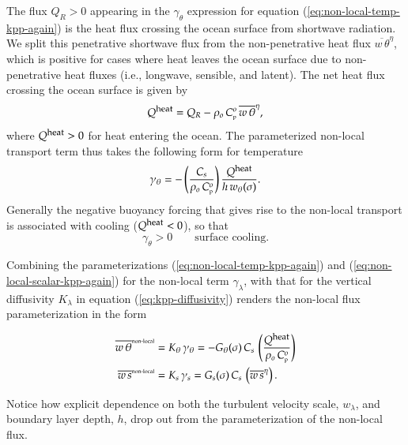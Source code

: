 The flux $Q_{R}>0$ appearing in the $\gamma_{\theta}$ expression for
equation (\ref{eq:non-local-temp-kpp-again}) is the heat flux crossing
the ocean surface from shortwave radiation.  We split this penetrative
shortwave flux from the non-penetrative heat flux $\overline{w \,
  \theta}^{\eta}$, which is positive for cases where heat leaves the
ocean surface due to non-penetrative heat fluxes (i.e., longwave,
sensible, and latent).  The net heat flux crossing the ocean surface
is given by
\begin{equation}
 Q^{\mbox{\footnotesize heat}}= Q_{R} - \rho_{o} \, C_{\mbox{\tiny p}}^{o} \,  \overline{w \, \theta}^{\eta},
\label{eq:heat-flux-penetrative-and-non-penetrative}
\end{equation}
where $Q^{\mbox{\footnotesize heat}} > 0$ for heat entering the ocean.
The parameterized non-local transport term thus takes the following
form for temperature
\begin{equation}
 \gamma_{\theta} = -\left(\frac{ C_{s}}{\rho_{o}  \, C_{\mbox{\tiny p}}^{o} } \right) 
  \frac{ Q^{\mbox{\footnotesize heat}} }{h \,  w_{\theta}(\sigma)}.  
\label{eq:non-local-temp-kpp-again}
\end{equation}
Generally the negative buoyancy forcing that gives rise to the
non-local transport is associated with cooling
($Q^{\mbox{\footnotesize heat}} < 0$), so that 
\begin{equation}
  \gamma_{\theta} > 0 \qquad \mbox{surface cooling}.
\label{eq:surface-cooling-gamma-theta}
\end{equation}

Combining the parameterizations (\ref{eq:non-local-temp-kpp-again}) and
(\ref{eq:non-local-scalar-kpp-again}) for the non-local term
$\gamma_{\lambda}$, with that for the vertical diffusivity
$K_{\lambda}$ in equation (\ref{eq:kpp-diffusivity}) renders the
non-local flux parameterization in the form
\begin{mdframed}[backgroundcolor=lightgray!50]
\begin{align}
\overline{w \, \theta}^{\mbox{\tiny non-local}} &= K_{\theta}  \, \gamma_{\theta}
  = 
 - G_{\theta}(\sigma) \, C_{s} \, \left( \frac{ Q^{\mbox{\footnotesize heat}}}{ \rho_{o}  \, C_{\mbox{\tiny p}}^{o} } \right)
\label{eq:non-local-flux-kpp-param-temp-again}
\\
\overline{w \, s}^{\mbox{\tiny non-local}} &= K_{s}  \, \gamma_{s}
  = 
 G_{s}(\sigma) \, C_{s}\,\left( \overline{w \, s}^{\eta} \right).
\label{eq:non-local-flux-kpp-param-scalar-again}
\end{align}
\end{mdframed}
Notice how explicit dependence on both the turbulent velocity scale,
$w_{\lambda}$, and boundary layer depth, $h$, drop out from the
parameterization of the non-local flux.



